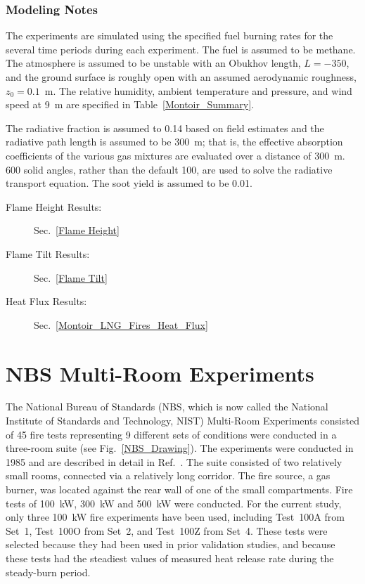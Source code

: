 \subsubsection{Modeling Notes}

The experiments are simulated using the specified fuel burning rates for the several time periods during each experiment. The fuel is assumed to be methane. The atmosphere is assumed to be unstable with an Obukhov length, $L=-350$, and the ground surface is roughly open with an assumed aerodynamic roughness, $z_0=0.1$~m. The relative humidity, ambient temperature and pressure, and wind speed at 9~m are specified in Table~\ref{Montoir_Summary}.

The radiative fraction is assumed to 0.14 based on field estimates and the radiative path length is assumed to be 300~m; that is, the effective absorption coefficients of the various gas mixtures are evaluated over a distance of 300~m. 600 solid angles, rather than the default 100, are used to solve the radiative transport equation. The soot yield is assumed to be 0.01.

\begin{description}
\item[Flame Height Results:] Sec.~\ref{Flame Height}
\item[Flame Tilt Results:] Sec.~\ref{Flame Tilt}
\item[Heat Flux Results:] Sec.~\ref{Montoir_LNG_Fires_Heat_Flux}
\end{description}

\FloatBarrier


\section{NBS Multi-Room Experiments}
\label{NBS_Multi-Room_Description}

The National Bureau of Standards (NBS, which is now called the National Institute of Standards and Technology, NIST) Multi-Room Experiments consisted of 45 fire tests representing 9 different sets of conditions were conducted in a three-room suite (see Fig.~\ref{NBS_Drawing}). The experiments were conducted in 1985 and are described in detail in Ref.~\cite{Peacock:NBS_Multi-Room}. The suite consisted of two relatively small rooms, connected via a relatively long corridor. The fire source, a gas burner, was located against the rear wall of one of the small compartments.  Fire tests of 100~kW, 300~kW and 500~kW were conducted. For the current study, only three 100~kW fire experiments have been used, including Test~100A from Set~1, Test~100O from Set~2, and Test~100Z from Set~4. These tests were selected because they had been used in prior validation studies, and because these tests had the steadiest values of measured heat release rate during the steady-burn period.

